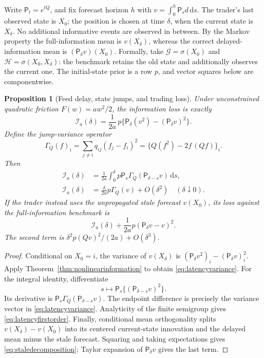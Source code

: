 \documentclass[11pt]{article}
\theoremstyle{plain}
\newtheorem{proposition}[theorem]{Proposition}
\theoremstyle{definition}
\theoremstyle{remark}
\newcommand{\dd}{\,\mathrm d}
\begin{document}
Write \(\mathsf P_t=e^{tQ}\), and fix forecast horizon \(h\) with
\(v=\int_0^h\mathsf P_s d\dd s\).
The trader's last observed state is \(X_0\); the position is chosen
at time \(\delta\), when the current state is \(X_\delta\).
No additional informative events are observed in between. By the
Markov property the full-information mean is \(v(X_\delta)\),
whereas the correct delayed-information mean is
\((\mathsf P_\delta v)(X_0)\).
Formally, take \(\mathcal G=\sigma(X_0)\) and
\(\mathcal H=\sigma(X_0,X_\delta)\): the benchmark retains
the old state and additionally observes the current one.
The initial-state prior is a row \(p\), and vector squares below
are componentwise.

\begin{proposition}[Feed delay, state jumps, and trading loss]
\label{prop:feedlatency}
Under unconstrained quadratic friction \(F(w)=aw^2/2\),
the information loss is exactly
\begin{equation}\label{eq:latencyvariance}
 \mathcal I_a(\delta)
 =\frac1{2a}\,
  p\{\mathsf P_\delta(v^2)-(\mathsf P_\delta v)^2\}.
\end{equation}
Define the jump-variance operator
\[
 \Gamma_Q(f)_i
 =\sum_{j\ne i}q_{ij}(f_j-f_i)^2
 =\{Q(f^2)-2f\,(Qf)\}_i .
\]
Then
\begin{align}
 \mathcal I_a(\delta)
 &=\frac1{2a}\int_0^\delta
     p\mathsf P_s\Gamma_Q(\mathsf P_{\delta-s}v)\dd s,
 \label{eq:latencycarre}\\
 \mathcal I_a(\delta)
 &=\frac{\delta}{2a}p\Gamma_Q(v)+O(\delta^2)
 \quad(\delta\downarrow0). \label{eq:latencyfirstorder}
\end{align}
If the trader instead uses the unpropagated stale forecast
\(v(X_0)\), its loss against the full-information benchmark is
\begin{equation}\label{eq:staledecomposition}
 \mathcal I_a(\delta)+
 \frac1{2a}p(\mathsf P_\delta v-v)^2 .
\end{equation}
The second term is
\(\delta^2p(Qv)^2/(2a)+O(\delta^3)\).
\end{proposition}
\begin{proof}
Conditional on \(X_0=i\), the variance of \(v(X_\delta)\)
is \((\mathsf P_\delta v^2)_i-(\mathsf P_\delta v)_i^2\).
Apply Theorem~\ref{thm:nonlinearinformation} to obtain
\eqref{eq:latencyvariance}.
For the integral identity, differentiate
\[
 s\longmapsto
 \mathsf P_s\{(\mathsf P_{\delta-s}v)^2\}.
\]
Its derivative is
\(\mathsf P_s\Gamma_Q(\mathsf P_{\delta-s}v)\).
The endpoint difference is precisely the variance vector in
\eqref{eq:latencyvariance}. Analyticity of the finite semigroup
gives \eqref{eq:latencyfirstorder}.
Finally, conditional mean orthogonality splits
\(v(X_\delta)-v(X_0)\) into its centered current-state innovation
and the delayed mean minus the stale forecast. Squaring and taking
expectations gives \eqref{eq:staledecomposition}; Taylor expansion
of \(\mathsf P_\delta v\) gives the last term.
\end{proof}
\end{document}
